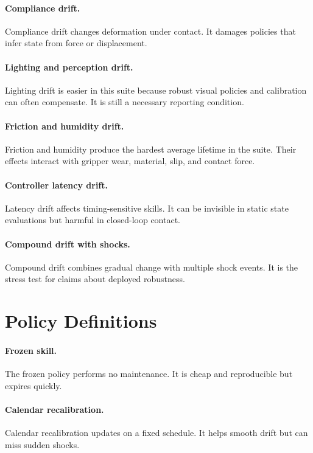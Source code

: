 \documentclass{article}
\begin{document}
\paragraph{Compliance drift.}
Compliance drift changes deformation under contact. It damages policies that
infer state from force or displacement.

\paragraph{Lighting and perception drift.}
Lighting drift is easier in this suite because robust visual policies and
calibration can often compensate. It is still a necessary reporting condition.

\paragraph{Friction and humidity drift.}
Friction and humidity produce the hardest average lifetime in the suite. Their
effects interact with gripper wear, material, slip, and contact force.

\paragraph{Controller latency drift.}
Latency drift affects timing-sensitive skills. It can be invisible in static
state evaluations but harmful in closed-loop contact.

\paragraph{Compound drift with shocks.}
Compound drift combines gradual change with multiple shock events. It is the
stress test for claims about deployed robustness.

\section{Policy Definitions}

\paragraph{Frozen skill.}
The frozen policy performs no maintenance. It is cheap and reproducible but
expires quickly.

\paragraph{Calendar recalibration.}
Calendar recalibration updates on a fixed schedule. It helps smooth drift but
can miss sudden shocks.
\end{document}
